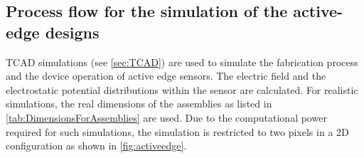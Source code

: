 \newpage
\subsection{Process flow for the simulation of the active-edge designs}
\label{sec:processFlowTCAD}

TCAD simulations (see \cref{sec:TCAD}) are used to simulate the
fabrication process and the device operation of active edge
sensors. The electric field and the electrostatic potential
distributions within the sensor are calculated. For realistic
simulations, the real dimensions of the assemblies as listed in
\cref{tab:DimensionsForAssemblies} are used. Due to the computational
power required for such simulations, the simulation is restricted to
two pixels in a 2D configuration as shown in \cref{fig:activeedge}.


